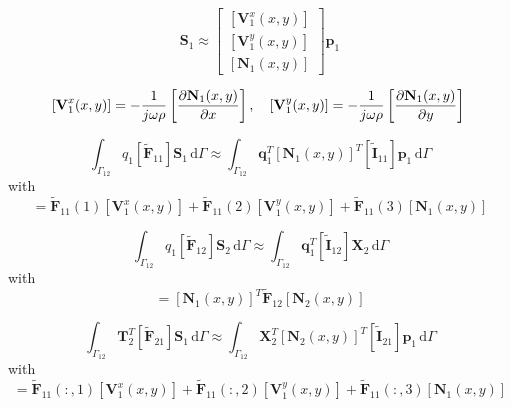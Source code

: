 \documentclass[11pt,A4paper]{book}
\newcommand{\ds}{\displaystyle}
\newcommand{\tb}{\textbf}
\newcommand{\tp}{^T}
\newcommand{\esp}{, \quad}
\newcommand{\p}{\partial}
\newcommand{\wdt}[1]{\widetilde{#1}}
\renewcommand{\d}{\,\textrm{d}}
\renewcommand{\:}{\tb{:}}
\begin{document}
\begin{equation}
\tb{S}_1\approx\left[
\begin{array}{c}
\left[\tb{V}_1^x(x,y)\right]\\
\left[\tb{V}_1^y(x,y)\right]\\
\left[\tb{N}_1(x,y)\right]
\end{array}
\right]\tb{p}_1
\end{equation}

\begin{equation}
	\left[\tb{V}_1^x(x,y)\right]=-\dfrac{1}{j\omega \rho}\left[\dfrac{\p \tb{N}_1(x,y)}{\p x}\right]\esp
\left[\tb{V}_1^y(x,y)\right]=
-\dfrac{1}{j\omega \rho}\left[\dfrac{\p \tb{N}_1(x,y)}{\p y}\right]\\
\end{equation}




\begin{equation}
	\ds{\int_{\Gamma_{12}}} 
q_1 [\wdt{\tb{F}}_{11}]\tb{S}_1
 \d\Gamma \approx \ds{\int_{\Gamma_{12}}} 
\tb{q}_1\tp \left[\tb{N}_1(x,y)\right]
\tp
[\wdt{\tb{I}}_{11}]
\tb{p}_1
 \d\Gamma 
\end{equation}
with
\begin{equation}
[\wdt{\tb{I}}_{11}]=	\wdt{\tb{F}}_{11}(1) \left[\tb{V}_1^x(x,y)\right]+\wdt{\tb{F}}_{11}(2)\left[\tb{V}_1^y(x,y)\right]+\wdt{\tb{F}}_{11}(3)\left[\tb{N}_1(x,y)
\right]
\end{equation}

\begin{equation}
	\ds{\int_{\Gamma_{12}}} 
q_1 [\wdt{\tb{F}}_{12}]\tb{S}_2
 \d\Gamma \approx \ds{\int_{\Gamma_{12}}} 
\tb{q}_1\tp [\wdt{\tb{I}}_{12}]
\tb{X}_2
 \d\Gamma 
\end{equation}
with
\begin{equation}
[\wdt{\tb{I}}_{12}]=	\left[\tb{N}_1(x,y)\right]
\tp
 \wdt{\tb{F}}_{12}\left[\tb{N}_2(x,y)\right]
\end{equation}


\begin{equation}
	\ds{\int_{\Gamma_{12}}} 
\tb{T}_2\tp  [\wdt{\tb{F}}_{21}]\tb{S}_1
 \d\Gamma \approx \ds{\int_{\Gamma_{12}}} 
\tb{X}_2\tp  \left[\tb{N}_2(x,y)\right]\tp
[\wdt{\tb{I}}_{21}]
\tb{p}_1
 \d\Gamma 
\end{equation}
with
\begin{equation}
[\wdt{\tb{I}}_{21}]=\wdt{\tb{F}}_{11}(:,1) \left[\tb{V}_1^x(x,y)\right]+\wdt{\tb{F}}_{11}(:,2)\left[\tb{V}_1^y(x,y)\right]+\wdt{\tb{F}}_{11}(:,3)\left[\tb{N}_1(x,y)
\right]
\end{equation}
\end{document}
